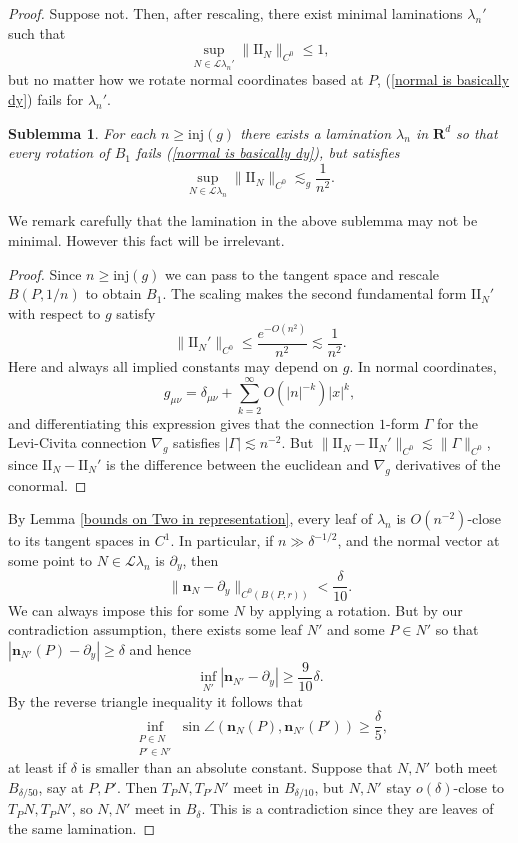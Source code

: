 \documentclass[reqno,11pt]{amsart}
\newcommand{\RR}{\mathbf{R}}
\newcommand{\Leaves}{\mathscr L}
\newcommand{\Two}{\mathrm{I\!I}}
\newcommand{\normal}{\mathbf n}
\newcommand{\inj}{\mathrm{inj}}
\newtheorem{sublemma}[theorem]{Sublemma}
\theoremstyle{definition}
\numberwithin{equation}{section}
\begin{document}
\begin{proof}
	Suppose not.
	Then, after rescaling, there exist minimal laminations $\lambda_n'$ such that
	$$\sup_{N \in \Leaves \lambda_n'} \|\Two_N\|_{C^0} \leq 1,$$
	but no matter how we rotate normal coordinates based at $P$, (\ref{normal is basically dy}) fails for $\lambda_n'$.

\begin{sublemma}
	For each $n \geq \inj(g)$ there exists a lamination $\lambda_n$ in $\RR^d$ so that every rotation of $B_1$ fails (\ref{normal is basically dy}), but satisfies
\begin{equation}\label{bounds on Two in representation}
	\sup_{N \in \Leaves \lambda_n} \|\Two_N\|_{C^0} \lesssim_g \frac{1}{n^2}.
\end{equation}
\end{sublemma}

We remark carefully that the lamination in the above sublemma may not be minimal.
However this fact will be irrelevant.

\begin{proof}
	Since $n \geq \inj(g)$ we can pass to the tangent space and rescale $B(P, 1/n)$ to obtain $B_1$. The scaling makes the second fundamental form $\Two_N'$ with respect to $g$ satisfy
$$\|\Two_N'\|_{C^0} \leq \frac{e^{-O(n^2)}}{n^2} \lesssim \frac{1}{n^2}.$$
	Here and always all implied constants may depend on $g$.
	In normal coordinates,
	$$g_{\mu \nu} = \delta_{\mu \nu} + \sum_{k=2}^\infty O(|n|^{-k}) |x|^k,$$
	and differentiating this expression gives that the connection $1$-form $\Gamma$ for the Levi-Civita connection $\nabla_g$ satisfies $|\Gamma| \lesssim n^{-2}$.
	But $\|\Two_N - \Two_N'\|_{C^0} \lesssim \|\Gamma\|_{C^0}$, since $\Two_N - \Two_N'$ is the difference between the euclidean and $\nabla_g$ derivatives of the conormal.
\end{proof}

	By Lemma \ref{bounds on Two in representation}, every leaf of $\lambda_n$ is $O(n^{-2})$-close to its tangent spaces in $C^1$.
	In particular, if $n \gg \delta^{-1/2}$, and the normal vector at some point to $N \in \Leaves \lambda_n$ is $\partial_y$, then
	$$\|\normal_N - \partial_y\|_{C^0(B(P, r))} < \frac{\delta}{10}.$$
	We can always impose this for some $N$ by applying a rotation.
	But by our contradiction assumption, there exists some leaf $N'$ and some $P \in N'$ so that $|\normal_{N'}(P) - \partial_y| \geq \delta$ and hence
	$$\inf_{N'} |\normal_{N'} - \partial_y| \geq \frac{9}{10}\delta.$$
	By the reverse triangle inequality it follows that
	$$\inf_{\substack{P \in N\\ P' \in N'}} \sin \angle(\normal_N(P), \normal_{N'}(P')) \geq \frac{\delta}{5},$$
	at least if $\delta$ is smaller than an absolute constant.
	Suppose that $N, N'$ both meet $B_{\delta/50}$, say at $P, P'$. Then $T_PN, T_{P'} N'$ meet in $B_{\delta/10}$, but $N, N'$ stay $o(\delta)$-close to $T_PN, T_PN'$, so $N, N'$ meet in $B_\delta$. This is a contradiction since they are leaves of the same lamination.
\end{proof}
\end{document}
